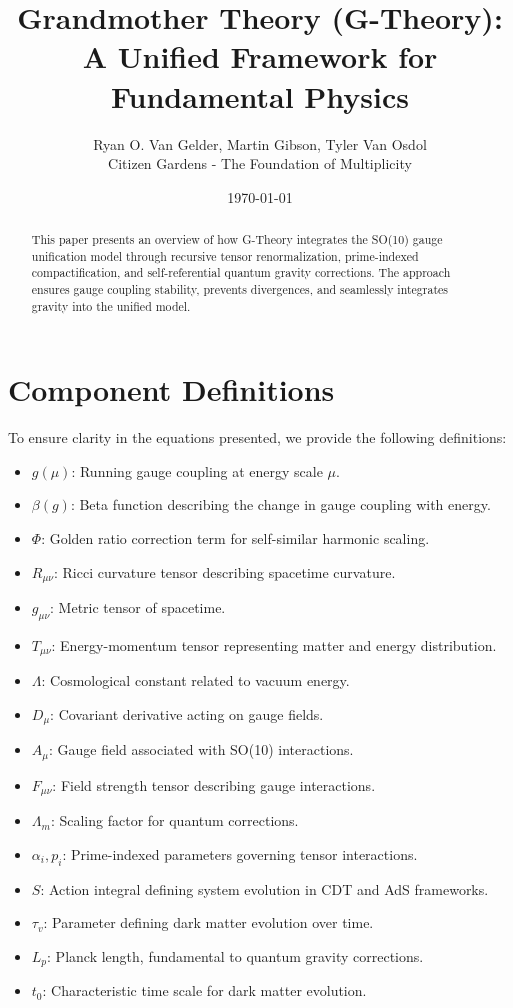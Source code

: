 \documentclass{article}
\begin{document}
\title{Grandmother Theory (G-Theory): A Unified Framework for Fundamental Physics}
\author{Ryan O. Van Gelder, Martin Gibson, Tyler Van Osdol \\ Citizen Gardens - The Foundation of Multiplicity}
\date{\today}


\maketitle

\begin{abstract}
This paper presents an overview of how G-Theory integrates the SO(10) gauge unification model through recursive tensor renormalization, prime-indexed compactification, and self-referential quantum gravity corrections. The approach ensures gauge coupling stability, prevents divergences, and seamlessly integrates gravity into the unified model.
\end{abstract}
\section{Component Definitions}
To ensure clarity in the equations presented, we provide the following definitions:

\begin{itemize}
    \item $g(\mu)$: Running gauge coupling at energy scale $\mu$.
    \item $\beta(g)$: Beta function describing the change in gauge coupling with energy.
    \item $\Phi$: Golden ratio correction term for self-similar harmonic scaling.
    \item $R_{\mu\nu}$: Ricci curvature tensor describing spacetime curvature.
    \item $g_{\mu\nu}$: Metric tensor of spacetime.
    \item $T_{\mu\nu}$: Energy-momentum tensor representing matter and energy distribution.
    \item $\Lambda$: Cosmological constant related to vacuum energy.
    \item $D_{\mu}$: Covariant derivative acting on gauge fields.
    \item $A_{\mu}$: Gauge field associated with SO(10) interactions.
    \item $F_{\mu\nu}$: Field strength tensor describing gauge interactions.
    \item $\Lambda_m$: Scaling factor for quantum corrections.
    \item $\alpha_i, p_i$: Prime-indexed parameters governing tensor interactions.
    \item $S$: Action integral defining system evolution in CDT and AdS frameworks.
    \item $\tau_v$: Parameter defining dark matter evolution over time.
    \item $L_p$: Planck length, fundamental to quantum gravity corrections.
    \item $t_0$: Characteristic time scale for dark matter evolution.
\end{itemize}
\end{document}
